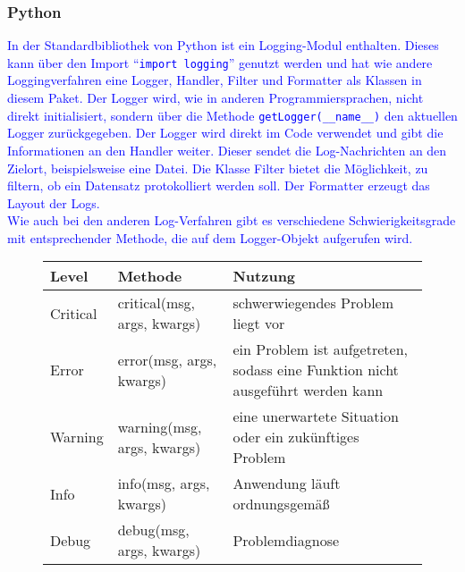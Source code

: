 \subsubsection{Python}\label{subsubsec:python}
\textcolor{blue}{
    In der Standardbibliothek von Python ist ein Logging-Modul enthalten.
    Dieses kann über den Import \enquote{\texttt{import logging}} genutzt werden und hat wie andere Loggingverfahren eine Logger, Handler, Filter und Formatter als Klassen in diesem Paket.
    Der Logger wird, wie in anderen Programmiersprachen, nicht direkt initialisiert, sondern über die Methode \texttt{getLogger(\_\_name\_\_)} den aktuellen Logger zurückgegeben.
    Der Logger wird direkt im Code verwendet und gibt die Informationen an den Handler weiter.
    Dieser sendet die Log-Nachrichten an den Zielort, beispielsweise eine Datei.
    Die Klasse Filter bietet die Möglichkeit, zu filtern, ob ein Datensatz protokolliert werden soll.
    Der Formatter erzeugt das Layout der Logs.
    \\
    Wie auch bei den anderen Log-Verfahren gibt es verschiedene Schwierigkeitsgrade mit entsprechender Methode, die auf dem Logger-Objekt aufgerufen wird.
    \\
    \begin{figure}[h]
        \centering
        \textcolor{blue}{
            \begin{tabular}[h]{|p{1.5cm}|p{5cm}|p{6cm}|}
                \rowcolor{gray!50}
                \hline
                Level    & Methode                       & Nutzung                                                                        \\
                \hline
                Critical & critical(msg, args, kwargs)   & schwerwiegendes Problem liegt vor                                              \\
                \hline
                Error    & error(msg, args, kwargs)      & ein Problem ist aufgetreten, sodass eine Funktion nicht ausgeführt werden kann \\
                \hline
                Warning  & warning(msg, args, kwargs)    & eine unerwartete Situation oder ein zukünftiges Problem                        \\
                \hline
                Info     & info(msg, args, kwargs)       & Anwendung läuft ordnungsgemäß                                                  \\
                \hline
                Debug    & debug(msg, args, kwargs)      & Problemdiagnose                                                                \\

\end{tabular}}
\end{figure}}
